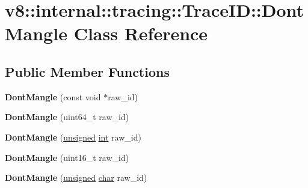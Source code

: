 \hypertarget{classv8_1_1internal_1_1tracing_1_1TraceID_1_1DontMangle}{}\section{v8\+:\+:internal\+:\+:tracing\+:\+:Trace\+ID\+:\+:Dont\+Mangle Class Reference}
\label{classv8_1_1internal_1_1tracing_1_1TraceID_1_1DontMangle}
\subsection*{Public Member Functions}
\begin{DoxyCompactItemize}
\item 
\mbox{\label{classv8_1_1internal_1_1tracing_1_1TraceID_1_1DontMangle_a9a72930e7a8bdccec05a64aaf7ca171a}} 
{\bfseries Dont\+Mangle} (const void $\ast$raw\+\_\+id)
\item 
\mbox{\label{classv8_1_1internal_1_1tracing_1_1TraceID_1_1DontMangle_a640a9983c376d13087feda4742eddb14}} 
{\bfseries Dont\+Mangle} (uint64\+\_\+t raw\+\_\+id)
\item 
\mbox{\label{classv8_1_1internal_1_1tracing_1_1TraceID_1_1DontMangle_a5898fec399901817757a0c8895b0e699}} 
{\bfseries Dont\+Mangle} (\mbox{\hyperlink{classunsigned}{unsigned}} \mbox{\hyperlink{classint}{int}} raw\+\_\+id)
\item 
\mbox{\label{classv8_1_1internal_1_1tracing_1_1TraceID_1_1DontMangle_aec4092f89544a255adcba0a4dc6130e0}} 
{\bfseries Dont\+Mangle} (uint16\+\_\+t raw\+\_\+id)
\item 
\mbox{\label{classv8_1_1internal_1_1tracing_1_1TraceID_1_1DontMangle_acf84b4c1d8614000b4168680992f734a}} 
{\bfseries Dont\+Mangle} (\mbox{\hyperlink{classunsigned}{unsigned}} \mbox{\hyperlink{classchar}{char}} raw\+\_\+id)
\item 
\mbox{\label{classv8_1_1internal_1_1tracing_1_1TraceID_1_1DontMangle_a8abe36b0255ea3f3e3aef4701520af5b}} 

\end{DoxyCompactItemize}
